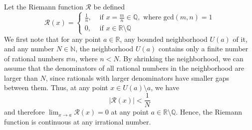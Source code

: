   \begin{example}
    Let the Riemann function $\mathcal{R}$ be defined
    \begin{equation}
      \mathcal{R}(x) = \begin{cases}
      \frac{1}{n}, & \text{ if } x = \frac{m}{n} \in \mathbb{Q}, \text{ where gcd}(m, n) = 1 \\
      0, & \text{ if } x \in \mathbb{R} \setminus \mathbb{Q}
      \end{cases}
    \end{equation}
    We first note that for any point $a \in \mathbb{R}$, any bounded neighborhood $U(a)$ of it, and any number $N \in \mathbb{N}$, the neighborhood $U(a)$ contains only a finite number of rational numbers $\mathbb{m}{n}$, where $n < N$. By shrinking the neighborhood, we can assume that the denominators of all rational numbers in the neighborhood are larger than $N$, since rationals with larger denominators have smaller gaps between them. Thus, at any point $x \in U(a) \setminus a$, we have 
    \begin{equation}
      \big| \mathcal{R}(x) \big| < \frac{1}{N}
    \end{equation}
    and therefore $\lim_{x \rightarrow a} \mathcal{R} (x) = 0$ at any point $a \in \mathbb{R} \setminus \mathbb{Q}$. Hence, the Riemann function is continuous at any irrational number. 
  \end{example}



